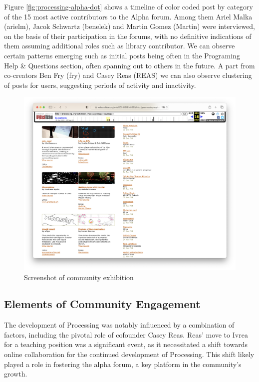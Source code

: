 \begin{multicols}{3}
	\noindent
  Figure \ref*{fig:processing-alpha-dot} shows a timeline of color coded post by category of the 15 most active contributors to the Alpha forum. Among them Ariel Malka (arielm), Jacok Schwartz (benelek) and Martin Gomez (Martin) were interviewed, on the basis of their participation in the forums, with no definitive indications of them assuming additional roles such as library contributor. We can observe certain patterns emerging such as initial posts being often in the Programing Help \& Questions section, often spanning out to others in the future. A part from co-creators Ben Fry (fry) and Casey Reas (REAS) we can also observe clustering of posts for users, suggesting periods of activity and inactivity. 
  \columnbreak

  \vfill\null
\end{multicols}

\newpage
\begin{figure}
	\centering
	\includegraphics[width=1.0\textwidth]{images/exhibitions.png}
	\caption{Screenshot of community exhibition}
	\label{fig:website-exhibition}
\end{figure}

\subsection{Elements of Community Engagement}
The development of Processing was notably influenced by a combination of factors, including the pivotal role of cofounder Casey Reas. Reas' move to Ivrea for a teaching position was a significant event, as it necessitated a shift towards online collaboration for the continued development of Processing. This shift likely played a role in fostering the alpha forum, a key platform in the community's growth.

